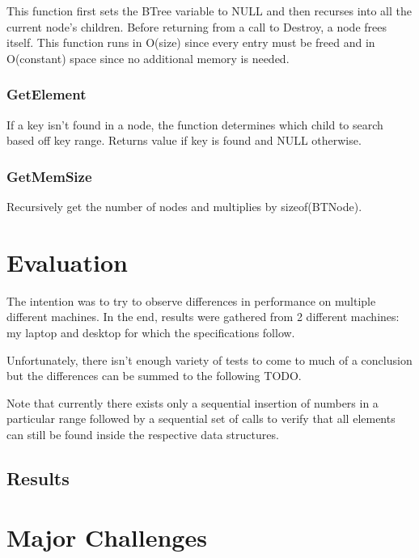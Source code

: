 \documentclass[twocolumn]{article}
\begin{document}
This function first sets the BTree variable to NULL and then recurses into all
the current node's children. Before returning from a call to Destroy, a node
frees itself. This function runs in O(size) since every entry must be freed and
in O(constant) space since no additional memory is needed.

\subsubsection{GetElement}

If a key isn't found in a node, the function determines which child to search
based off key range. Returns value if key is found and NULL otherwise.

\subsubsection{GetMemSize}

Recursively get the number of nodes and multiplies by sizeof(BTNode).

\section{Evaluation}

The intention was to try to observe differences in performance on multiple
different machines. In the end, results were gathered from 2 different machines:
my laptop and desktop for which the specifications follow.


Unfortunately, there isn't enough variety of tests to come to much of a
conclusion but the differences can be summed to the following TODO.

Note that currently there exists only a sequential insertion of numbers in a
particular range followed by a sequential set of calls to verify that all
elements can still be found inside the respective data structures.

\subsection{Results}


\section{Major Challenges}
\end{document}
